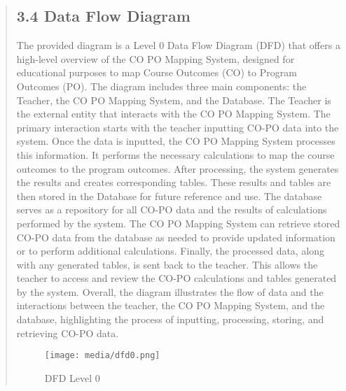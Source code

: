 \documentclass[12pt]{report}
\begin{document}
\begin{quote}
		\subsection{3.4 Data Flow Diagram}
		\hspace{1cm}The provided diagram is a Level 0 Data Flow Diagram (DFD) that offers a high-level overview of the CO PO Mapping System, designed for educational purposes to map Course Outcomes (CO) to Program Outcomes (PO). The diagram includes three main components: the Teacher, the CO PO Mapping System, and the Database.
		The Teacher is the external entity that interacts with the CO PO Mapping System. The primary interaction starts with the teacher inputting CO-PO data into the system. Once the data is inputted, the CO PO Mapping System processes this information. It performs the necessary calculations to map the course outcomes to the program outcomes. After processing, the system generates the results and creates corresponding tables.
		These results and tables are then stored in the Database for future reference and use. The database serves as a repository for all CO-PO data and the results of calculations performed by the system. The CO PO Mapping System can retrieve stored CO-PO data from the database as needed to provide updated information or to perform additional calculations.
		Finally, the processed data, along with any generated tables, is sent back to the teacher. This allows the teacher to access and review the CO-PO calculations and tables generated by the system. Overall, the diagram illustrates the flow of data and the interactions between the teacher, the CO PO Mapping System, and the database, highlighting the process of inputting, processing, storing, and retrieving CO-PO data.
		\begin{figure}
			\centering
			\texttt{[image: media/dfd0.png]}\\
			\caption{DFD Level 0}
		\end{figure}
		\clearpage
		

\end{quote}
\end{document}
